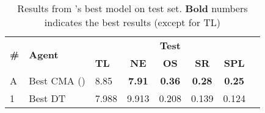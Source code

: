 \begin{table*}

\caption{\label{table:all_test_final} Results from \citet{VLNCE}'s best model on test set. \textbf{Bold} numbers indicates the best results (except for TL)}
\renewcommand{\arraystretch}{1.2}
\centering
\small\addtolength{\tabcolsep}{-2.3pt}
\begin{tabular}{@{}lllccccc@{}}
\toprule
   \multirow{2}{*}{\textbf{\#}}
  & \multirow{2}{*}{\textbf{Agent}}
  & \multicolumn{5}{c}{\textbf{Test}} \\
  \cmidrule(l){3-7}
  & & \textbf{TL} & \textbf{NE} & \textbf{OS} & \textbf{SR} & \textbf{SPL} \\
\midrule
A & Best CMA (\citet{VLNCE})  & 8.85 & \textbf{7.91} & \textbf{0.36} & \textbf{0.28} & \textbf{0.25}  \\
\midrule
1 & Best DT  & 7.988 & 	9.913 & 0.208 & 0.139 & 0.124  \\

\bottomrule
\end{tabular}
\end{table*}
